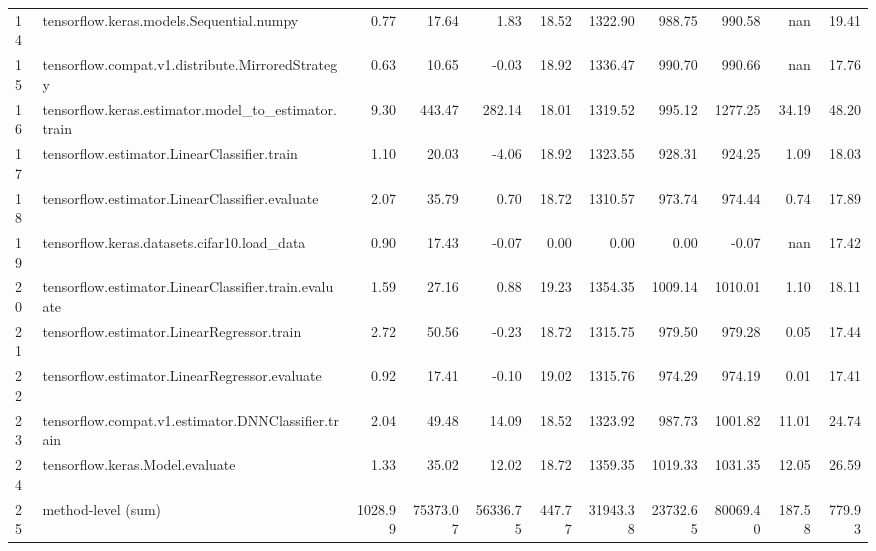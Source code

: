 \begin{tabular}{llrrrrrrrrr}
14 & tensorflow.keras.models.Sequential.numpy & 0.77 & 17.64 & 1.83 & 18.52 & 1322.90 & 988.75 & 990.58 & nan & 19.41 \\
15 & tensorflow.compat.v1.distribute.MirroredStrategy & 0.63 & 10.65 & -0.03 & 18.92 & 1336.47 & 990.70 & 990.66 & nan & 17.76 \\
16 & tensorflow.keras.estimator.model_to_estimator.train & 9.30 & 443.47 & 282.14 & 18.01 & 1319.52 & 995.12 & 1277.25 & 34.19 & 48.20 \\
17 & tensorflow.estimator.LinearClassifier.train & 1.10 & 20.03 & -4.06 & 18.92 & 1323.55 & 928.31 & 924.25 & 1.09 & 18.03 \\
18 & tensorflow.estimator.LinearClassifier.evaluate & 2.07 & 35.79 & 0.70 & 18.72 & 1310.57 & 973.74 & 974.44 & 0.74 & 17.89 \\
19 & tensorflow.keras.datasets.cifar10.load_data & 0.90 & 17.43 & -0.07 & 0.00 & 0.00 & 0.00 & -0.07 & nan & 17.42 \\
20 & tensorflow.estimator.LinearClassifier.train.evaluate & 1.59 & 27.16 & 0.88 & 19.23 & 1354.35 & 1009.14 & 1010.01 & 1.10 & 18.11 \\
21 & tensorflow.estimator.LinearRegressor.train & 2.72 & 50.56 & -0.23 & 18.72 & 1315.75 & 979.50 & 979.28 & 0.05 & 17.44 \\
22 & tensorflow.estimator.LinearRegressor.evaluate & 0.92 & 17.41 & -0.10 & 19.02 & 1315.76 & 974.29 & 974.19 & 0.01 & 17.41 \\
23 & tensorflow.compat.v1.estimator.DNNClassifier.train & 2.04 & 49.48 & 14.09 & 18.52 & 1323.92 & 987.73 & 1001.82 & 11.01 & 24.74 \\
24 & tensorflow.keras.Model.evaluate & 1.33 & 35.02 & 12.02 & 18.72 & 1359.35 & 1019.33 & 1031.35 & 12.05 & 26.59 \\
25 & method-level (sum) & 1028.99 & 75373.07 & 56336.75 & 447.77 & 31943.38 & 23732.65 & 80069.40 & 187.58 & 779.93 \\
\end{tabular}
